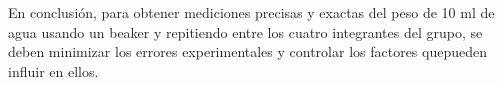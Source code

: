 \documentclass[letterpaper]{IEEEconf}
\begin{document}
En conclusión, para obtener mediciones precisas y exactas del peso de 10 ml de agua usando un beaker y repitiendo entre los cuatro integrantes del grupo, se deben minimizar los errores experimentales y controlar los factores quepueden influir en ellos.

\printbibliography %



\end{document}

